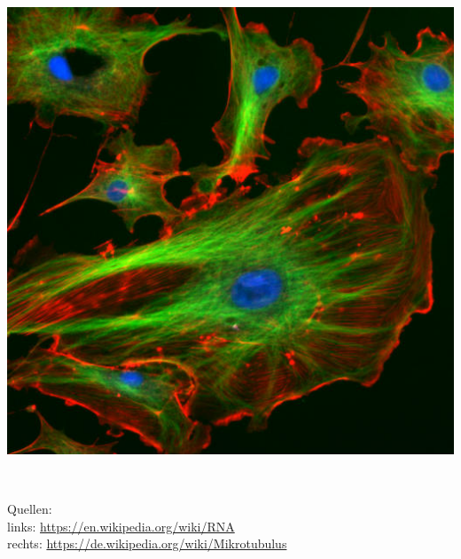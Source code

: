 \begin{frame}
\begin{minipage}{0.3\textwidth}
	\includegraphics[width=\textwidth]{Plots/FluorescentCells.jpg}
	\end{minipage} \\
  \begin{minipage}{\textwidth}
    \begin{tiny}
       Quellen:\\
        links:  \url{https://en.wikipedia.org/wiki/RNA}\\%
        rechts: \url{https://de.wikipedia.org/wiki/Mikrotubulus}%
    \end{tiny}
  \end{minipage}

\end{frame}


